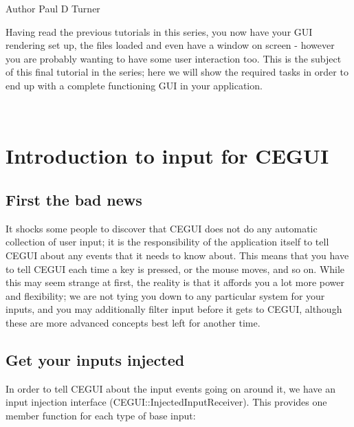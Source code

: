 \begin{DoxyAuthor}{Author}
Paul D Turner
\end{DoxyAuthor}
Having read the previous tutorials in this series, you now have your G\+UI rendering set up, the files loaded and even have a window on screen -\/ however you are probably wanting to have some user interaction too. This is the subject of this final tutorial in the series; here we will show the required tasks in order to end up with a complete functioning G\+UI in your application.

~\newline
 \hypertarget{input_tutorial_input_tutorial_intro}{}\section{Introduction to input for C\+E\+G\+UI}\label{input_tutorial_input_tutorial_intro}
\hypertarget{input_tutorial_input_tutorial_intro_badnews}{}\subsection{First the bad news}\label{input_tutorial_input_tutorial_intro_badnews}
It shocks some people to discover that C\+E\+G\+UI does not do any automatic collection of user input; it is the responsibility of the application itself to tell C\+E\+G\+UI about any events that it needs to know about. This means that you have to tell C\+E\+G\+UI each time a key is pressed, or the mouse moves, and so on. While this may seem strange at first, the reality is that it affords you a lot more power and flexibility; we are not tying you down to any particular system for your inputs, and you may additionally filter input before it gets to C\+E\+G\+UI, although these are more advanced concepts best left for another time.\hypertarget{input_tutorial_input_tutorial_intro_injectors}{}\subsection{Get your inputs injected}\label{input_tutorial_input_tutorial_intro_injectors}
In order to tell C\+E\+G\+UI about the input events going on around it, we have an input injection interface (C\+E\+G\+U\+I\+::\+Injected\+Input\+Receiver). This provides one member function for each type of base input\+:


